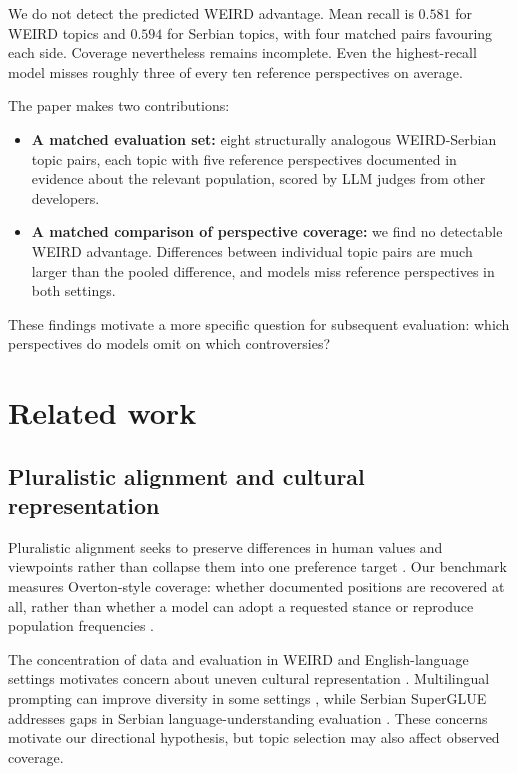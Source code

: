 \documentclass[11pt,a4paper]{article}
\begin{document}
We do not detect the predicted WEIRD advantage. Mean recall is $0.581$ for WEIRD topics and $0.594$ for Serbian topics, with four matched pairs favouring each side. Coverage nevertheless remains incomplete. Even the highest-recall model misses roughly three of every ten reference perspectives on average.

The paper makes two contributions:
\begin{itemize}
\item \textbf{A matched evaluation set:} eight structurally analogous WEIRD-Serbian topic pairs, each topic with five reference perspectives documented in evidence about the relevant population, scored by LLM judges from other developers.
\item \textbf{A matched comparison of perspective coverage:} we find no detectable WEIRD advantage. Differences between individual topic pairs are much larger than the pooled difference, and models miss reference perspectives in both settings.
\end{itemize}

These findings motivate a more specific question for subsequent evaluation: which perspectives do models omit on which controversies?

\section{Related work}
\label{sec:Related work}
\subsection{Pluralistic alignment and cultural representation}
\label{sec:Pluralistic alignment and cultural representation}
Pluralistic alignment seeks to preserve differences in human values and viewpoints rather than collapse them into one preference target \cite{sorensenRoadmapPluralisticAlignment2024,fengModularPluralismPluralistic2024,aliOperationalizingPluralisticValues2025}. Our benchmark measures Overton-style coverage: whether documented positions are recovered at all, rather than whether a model can adopt a requested stance or reproduce population frequencies \cite{sorensenRoadmapPluralisticAlignment2024}.

The concentration of data and evaluation in WEIRD and English-language settings motivates concern about uneven cultural representation \cite{sorensenRoadmapPluralisticAlignment2024,wangMultilingualPromptingImproving2025,zewailMoralStereotypingLarge2026}. Multilingual prompting can improve diversity in some settings \cite{wangMultilingualPromptingImproving2025}, while Serbian SuperGLUE addresses gaps in Serbian language-understanding evaluation \cite{perovicSerbianSuperGLUEEvaluation2026}. These concerns motivate our directional hypothesis, but topic selection may also affect observed coverage.
\end{document}
